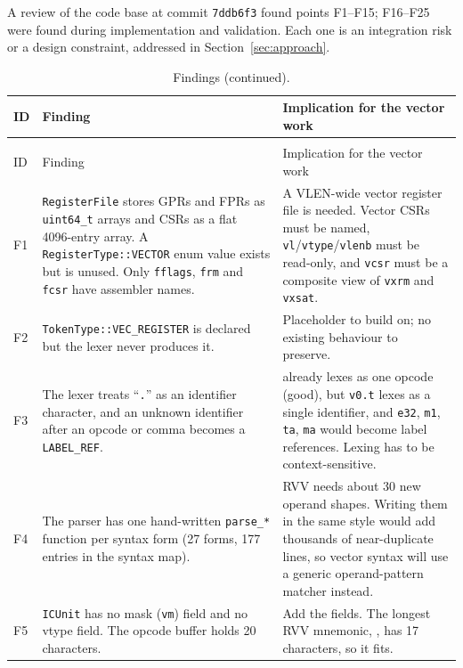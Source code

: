 \documentclass[11pt]{article}
\begin{document}
A review of the code base at commit \texttt{7ddb6f3} found points F1--F15; F16--F25 were found
during implementation and validation. Each one is an integration risk or a design constraint, addressed in
Section~\ref{sec:approach}.

\small
\begin{longtable}{@{}L{0.8cm}L{7.3cm}L{7.0cm}@{}}
\caption{Findings from the code review (F1--F15, at commit \texttt{7ddb6f3}) and from the implementation and validation (F16--F25).}\label{tab:findings}\\
\toprule
ID & Finding & Implication for the vector work \\
\midrule
\endfirsthead
\caption[]{Findings (continued).}\\
\toprule
ID & Finding & Implication for the vector work \\
\midrule
\endhead
F1 & \texttt{RegisterFile} stores GPRs and FPRs as \texttt{uint64\_t} arrays and CSRs as a flat 4096-entry array. A \texttt{RegisterType::VECTOR} enum value exists but is unused. Only \texttt{fflags}, \texttt{frm} and \texttt{fcsr} have assembler names. &
A VLEN-wide vector register file is needed. Vector CSRs must be named, \texttt{vl}/\texttt{vtype}/\texttt{vlenb} must be read-only, and \texttt{vcsr} must be a composite view of \texttt{vxrm} and \texttt{vxsat}. \\
F2 & \texttt{TokenType::VEC\_REGISTER} is declared but the lexer never produces it. & Placeholder to build on; no existing behaviour to preserve. \\
F3 & The lexer treats ``\texttt{.}'' as an identifier character, and an unknown identifier after an opcode or comma becomes a \texttt{LABEL\_REF}. &
 already lexes as one opcode (good), but \texttt{v0.t} lexes as a single identifier, and \texttt{e32}, \texttt{m1}, \texttt{ta}, \texttt{ma} would become label references. Lexing has to be context-sensitive. \\
F4 & The parser has one hand-written \texttt{parse\_*} function per syntax form (27 forms, 177 entries in the syntax map). &
RVV needs about 30 new operand shapes. Writing them in the same style would add thousands of near-duplicate lines, so vector syntax will use a generic operand-pattern matcher instead. \\
F5 & \texttt{ICUnit} has no mask (\texttt{vm}) field and no vtype field. The opcode buffer holds 20 characters. &
Add the fields. The longest RVV mnemonic, , has 17 characters, so it fits. \\

\end{longtable}
\end{document}
